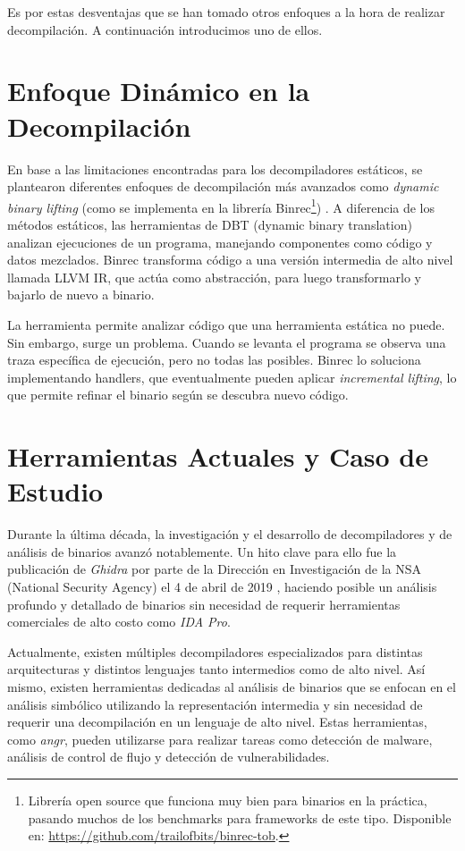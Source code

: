 \documentclass[runningheads]{llncs}
\begin{document}
Es por estas desventajas que se han tomado otros enfoques a la hora de realizar decompilación. 
A continuación introducimos uno de ellos.

\section{Enfoque Dinámico en la Decompilación}
En base a las limitaciones encontradas para los decompiladores estáticos, se plantearon diferentes 
enfoques de decompilación más avanzados como \textit{dynamic binary lifting} (como se implementa 
en la librería Binrec\footnote{Librería open source que funciona muy bien para binarios en la 
práctica, pasando muchos de los benchmarks para frameworks de este tipo. 
Disponible en: \url{https://github.com/trailofbits/binrec-tob}.}) \cite{binrec}. A diferencia de 
los métodos estáticos, las herramientas de DBT (dynamic binary translation) analizan ejecuciones 
de un programa, manejando componentes como código y datos mezclados. Binrec transforma código 
a una versión intermedia de alto nivel llamada LLVM IR, que actúa como abstracción, para 
luego transformarlo y bajarlo de nuevo a binario.

La herramienta permite analizar código que una herramienta estática no puede. Sin embargo, 
surge un problema. Cuando se levanta el programa se observa una traza específica de ejecución, 
pero no todas las posibles. Binrec lo soluciona implementando handlers, que eventualmente pueden 
aplicar \textit{incremental lifting}, lo que permite refinar el binario según se descubra nuevo código.

\section{Herramientas Actuales y Caso de Estudio}
Durante la última década, la investigación y el desarrollo de decompiladores y de análisis de binarios 
avanzó notablemente. Un hito clave para ello fue la publicación de \textit{Ghidra} por parte de 
la Dirección en Investigación de la NSA (National Security Agency) el 4 de abril de 2019 \cite{ghidra-book},
haciendo posible un análisis profundo y detallado de binarios sin necesidad de requerir herramientas 
comerciales de alto costo como \textit{IDA Pro}.

Actualmente, existen múltiples decompiladores especializados para distintas arquitecturas y distintos 
lenguajes tanto intermedios como de alto nivel. Así mismo, existen herramientas dedicadas al análisis 
de binarios que se enfocan en el análisis simbólico utilizando la representación intermedia y sin 
necesidad de requerir una decompilación en un lenguaje de alto nivel. Estas herramientas, como 
\textit{angr}, pueden utilizarse para realizar tareas como detección de malware, análisis de control 
de flujo y detección de vulnerabilidades.
\end{document}
